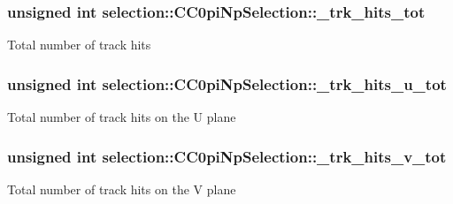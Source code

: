 \subsubsection[{\texorpdfstring{\+\_\+trk\+\_\+hits\+\_\+tot}{_trk_hits_tot}}]{\setlength{\rightskip}{0pt plus 5cm}unsigned int selection\+::\+C\+C0pi\+Np\+Selection\+::\+\_\+trk\+\_\+hits\+\_\+tot\hspace{0.3cm}{\ttfamily [private]}}\hypertarget{classselection_1_1CC0piNpSelection_a420b9962478d7998282e03f1ccf89c2e}{}\label{classselection_1_1CC0piNpSelection_a420b9962478d7998282e03f1ccf89c2e}
Total number of track hits 
\subsubsection[{\texorpdfstring{\+\_\+trk\+\_\+hits\+\_\+u\+\_\+tot}{_trk_hits_u_tot}}]{\setlength{\rightskip}{0pt plus 5cm}unsigned int selection\+::\+C\+C0pi\+Np\+Selection\+::\+\_\+trk\+\_\+hits\+\_\+u\+\_\+tot\hspace{0.3cm}{\ttfamily [private]}}\hypertarget{classselection_1_1CC0piNpSelection_af7d0e867df8901ff3e531b4c1b96408a}{}\label{classselection_1_1CC0piNpSelection_af7d0e867df8901ff3e531b4c1b96408a}
Total number of track hits on the U plane 
\subsubsection[{\texorpdfstring{\+\_\+trk\+\_\+hits\+\_\+v\+\_\+tot}{_trk_hits_v_tot}}]{\setlength{\rightskip}{0pt plus 5cm}unsigned int selection\+::\+C\+C0pi\+Np\+Selection\+::\+\_\+trk\+\_\+hits\+\_\+v\+\_\+tot\hspace{0.3cm}{\ttfamily [private]}}\hypertarget{classselection_1_1CC0piNpSelection_a30fe5ccb6a299f7955125aa6c9d5923d}{}\label{classselection_1_1CC0piNpSelection_a30fe5ccb6a299f7955125aa6c9d5923d}
Total number of track hits on the V plane 
